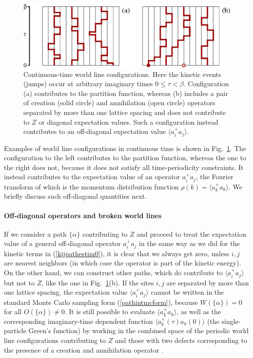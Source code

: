 \documentclass[draft,numberedheadings]{aipproc}
\begin{document}
\begin{figure}
\includegraphics[width=11.75cm]{tpathintegral.eps}
\caption{Continuous-time world line configurations. Here the kinetic events (jumps) occur at arbitrary imaginary times $0 \le \tau < \beta$. Configuration (a) 
contributes to the partition function, whereas (b) includes a pair of creation (solid circle) and annihilation (open circle) operators separated by more
than one lattice spacing and does not contribute to $Z$ or diagonal expectation values. Such a configuration instead contributes to an off-diagonal 
expectation value $\langle a^+_ia_j\rangle$.}
\label{tpathintegral}
\end{figure}

Examples of world line configurations in continuous time is shown in Fig.~\ref{tpathintegral}. 
The configuration to the left contributes to the partition function, whereas the one to the right does not, because it does not satisfy all time-periodicity 
constraints. It instead contributes to the expectation value of an operator $a^+_ia_j$, the Fourier transform of which is the momentum 
distribution function $\rho(k)=\langle a^+_ka_k\rangle$. We briefly discuss such off-diagonal quantities next.

\paragraph{Off-diagonal operators and broken world lines}

If we consider a path $\{\alpha\}$ contributing to $Z$ and proceed to treat the expectation value of a general off-diagonal operator $a^+_ia_j$ in 
the same way as we did for the kinetic terms in (\ref{kijpathestim0}), it is clear that we always get zero, unless $i,j$ are nearest neighbors (in which case the 
operator is part of the kinetic energy). On the other hand, we can construct other paths, which do contribute to $\langle a^+_ia_j\rangle$ but not to $Z$, 
like the one in Fig.~\ref{tpathintegral}(b). If the sites $i,j$ are separated by more than one lattice spacing, the expectation value $\langle a^+_ia_j\rangle$ 
cannot be written in the standard Monte Carlo sampling form (\ref{pathintmcform}), because $W(\{\alpha\})=0$ for all $O(\{\alpha\})\not=0$. It is still possible to 
evaluate $\langle a^+_ka_k\rangle$, as well as the corresponding imaginary-time dependent function $\langle a^+_k(\tau)a_k(0)\rangle$ (the single-particle 
Green's function) by working in the combined space of the periodic world line configurations contributing to $Z$ and those with two defects corresponding to the 
presence of a creation and annihilation operator \cite{prokofev96}. 
\end{document}
